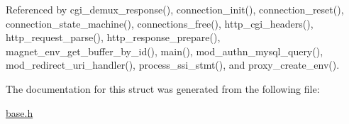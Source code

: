 Referenced by cgi\-\_\-demux\-\_\-response(), connection\-\_\-init(), connection\-\_\-reset(), connection\-\_\-state\-\_\-machine(), connections\-\_\-free(), http\-\_\-cgi\-\_\-headers(), http\-\_\-request\-\_\-parse(), http\-\_\-response\-\_\-prepare(), magnet\-\_\-env\-\_\-get\-\_\-buffer\-\_\-by\-\_\-id(), main(), mod\-\_\-authn\-\_\-mysql\-\_\-query(), mod\-\_\-redirect\-\_\-uri\-\_\-handler(), process\-\_\-ssi\-\_\-stmt(), and proxy\-\_\-create\-\_\-env().



The documentation for this struct was generated from the following file\-:\begin{DoxyCompactItemize}
\item 
\hyperlink{base_8h}{base.\-h}\end{DoxyCompactItemize}
